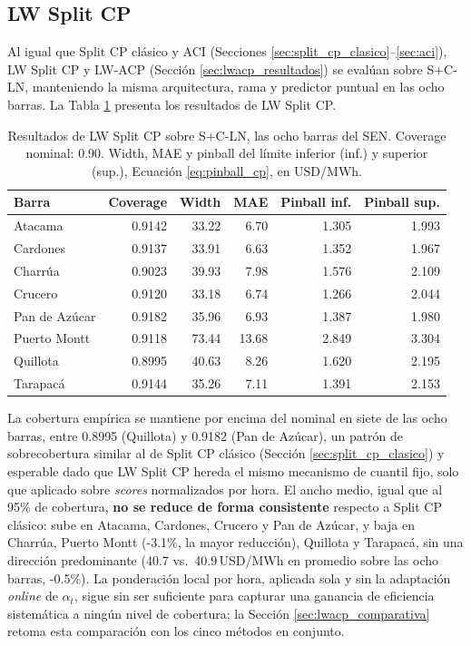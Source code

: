 \subsection{LW Split CP}
\label{sec:lw_split_cp}

Al igual que Split CP clásico y ACI (Secciones \ref{sec:split_cp_clasico}--\ref{sec:aci}), LW Split CP y LW-ACP (Sección \ref{sec:lwacp_resultados}) se evalúan sobre S+C-LN, manteniendo la misma arquitectura, rama y predictor puntual en las ocho barras. La Tabla \ref{tab:lwscp_resultados} presenta los resultados de LW Split CP.

\begin{table}[htbp]
    \centering
    \small
    \begin{tabular}{lrrrrr}
        \toprule
        Barra & Coverage & Width & MAE & Pinball inf. & Pinball sup. \\
        \midrule
        Atacama       & 0.9142 & 33.22 & 6.70  & 1.305 & 1.993 \\
        Cardones      & 0.9137 & 33.91 & 6.63  & 1.352 & 1.967 \\
        Charrúa       & 0.9023 & 39.93 & 7.98  & 1.576 & 2.109 \\
        Crucero       & 0.9120 & 33.18 & 6.74  & 1.266 & 2.044 \\
        Pan de Azúcar & 0.9182 & 35.96 & 6.93  & 1.387 & 1.980 \\
        Puerto Montt  & 0.9118 & 73.44 & 13.68 & 2.849 & 3.304 \\
        Quillota      & 0.8995 & 40.63 & 8.26  & 1.620 & 2.195 \\
        Tarapacá      & 0.9144 & 35.26 & 7.11  & 1.391 & 2.153 \\
        \bottomrule
    \end{tabular}
    \caption{Resultados de LW Split CP sobre S+C-LN, las ocho barras del SEN. Coverage nominal: 0.90. Width, MAE y pinball del límite inferior (inf.) y superior (sup.), Ecuación \ref{eq:pinball_cp}, en USD/MWh.}
    \label{tab:lwscp_resultados}
\end{table}

La cobertura empírica se mantiene por encima del nominal en siete de las ocho barras, entre 0.8995 (Quillota) y 0.9182 (Pan de Azúcar), un patrón de sobrecobertura similar al de Split CP clásico (Sección \ref{sec:split_cp_clasico}) y esperable dado que LW Split CP hereda el mismo mecanismo de cuantil fijo, solo que aplicado sobre \textit{scores} normalizados por hora. El ancho medio, igual que al 95\% de cobertura, \textbf{no se reduce de forma consistente} respecto a Split CP clásico: sube en Atacama, Cardones, Crucero y Pan de Azúcar, y baja en Charrúa, Puerto Montt (-3.1\%, la mayor reducción), Quillota y Tarapacá, sin una dirección predominante (40.7 vs.\ 40.9\,USD/MWh en promedio sobre las ocho barras, -0.5\%). La ponderación local por hora, aplicada sola y sin la adaptación \textit{online} de $\alpha_t$, sigue sin ser suficiente para capturar una ganancia de eficiencia sistemática a ningún nivel de cobertura; la Sección \ref{sec:lwacp_comparativa} retoma esta comparación con los cinco métodos en conjunto.

